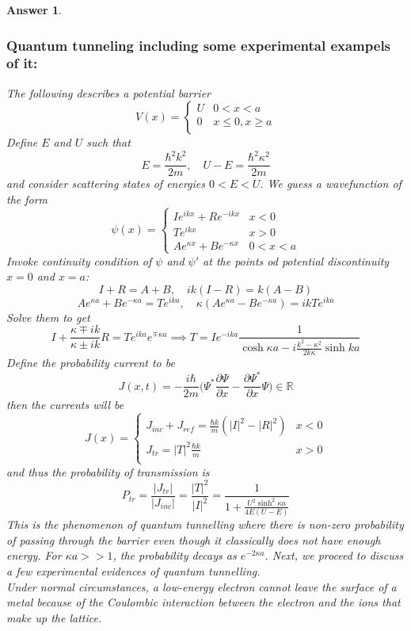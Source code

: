 \documentclass[a4paper]{article}
\newtheorem{ans}{Answer}[subsection]
\theoremstyle{new}
\begin{document}
\begin{ans}
\subsubsection*{Quantum tunneling including some experimental exampels of it:}
The following describes a potential barrier
   $$
V(x)=
\left\{
        \begin{array}{ll}
      U & 0<x<a\\
	0& x\leq 0,x\geq a\\
        \end{array}
    \right.
$$
Define $E$ and $U$ such that
$$E=\frac{\hbar^2k^2}{2m},\quad U-E=\frac{\hbar^2\kappa^2}{2m}$$
and consider scattering states of energies $0<E<U$. We guess a wavefunction of the form
       $$
\psi(x)=
\left\{
        \begin{array}{ll}
      Ie^{ikx}+Re^{-ikx} & x<0\\
 Te^{ikx}& x>0\\
 Ae^{\kappa x}+Be^{-\kappa x}&0<x<a
        \end{array}
    \right.
$$
Invoke continuity condition of $\psi$ and $\psi'$ at the points od potential discontinuity $x=0$ and $x=a$:
$$I+R=A+B,\quad ik(I-R)=k(A-B)$$
$$Ae^{\kappa a}+Be^{-\kappa a}=Te^{ika},\quad \kappa (Ae^{\kappa a}-Be^{-\kappa a})=ikTe^{ika}$$
Solve them to get 
$$I+\frac{\kappa\mp ik}{\kappa\pm ik}R=Te^{ika}e^{\mp\kappa a}\implies T=Ie^{-ika}\frac{1}{\cosh\kappa a-i\frac{k^2-\kappa^2}{2k\kappa}\sinh ka}$$
Define the probability current to be
$$J(x,t)=-\frac{i\hbar}{2m}\bigg(\Psi^*\frac{\partial\Psi}{\partial x}-\frac{\partial\Psi^*}{\partial x}\Psi\bigg)\in\mathbb{R}$$
then the currents will be
       $$
J(x)=
\left\{
        \begin{array}{ll}
      J_{inc}+J_{ref}=\frac{\hbar k}{m}(|I|^2-|R|^2)& x<0\\
J_{tr}=|T|^2\frac{\hbar k}{m}& x>0\\
        \end{array}
    \right.
$$
and thus the probability of transmission is
$$P_{tr}=\frac{|J_{tr}|}{|J_{inc}|}=\frac{|T|^2}{|I|^2}=\frac{1}{1+\frac{U^2\sinh^2\kappa a}{4E(U-E)}}$$
This is the phenomenon of quantum tunnelling where there is non-zero probability of passing through the barrier even though it classically does not have enough energy. For $\kappa a>>1$, the probability decays as $e^{-2\kappa a}$. Next, we proceed to discuss a few experimental evidences of quantum tunnelling.\\[5pt]
Under normal circumstances, a low-energy electron cannot leave the surface of a metal because of the Coulombic interaction between the electron and the ions that make up the lattice.

\end{ans}
\end{document}
